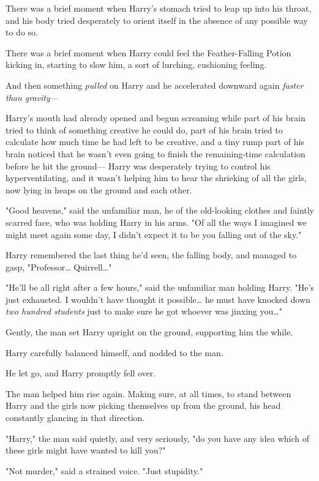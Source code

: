 There was a brief moment when Harry's stomach tried to leap up into his throat,
and his body tried desperately to orient itself in the absence of any possible
way to do so.

There was a brief moment when Harry could feel the Feather-Falling Potion
kicking in, starting to slow him, a sort of lurching, cushioning feeling.

And then something \emph{pulled} on Harry and he accelerated downward again
\emph{faster than gravity---}

Harry's mouth had already opened and begun screaming while part of his brain
tried to think of something creative he could do, part of his brain tried to
calculate how much time he had left to be creative, and a tiny rump part of his
brain noticed that he wasn't even going to finish the remaining-time
calculation before he hit the ground---
\later
Harry was desperately trying to control his hyperventilating, and it wasn't
helping him to hear the shrieking of all the girls, now lying in heaps on the
ground and each other.

"Good heavens," said the unfamiliar man, he of the old-looking clothes and
faintly scarred face, who was holding Harry in his arms. "Of all the ways I
imagined we might meet again some day, I didn't expect it to be you falling out
of the sky."

Harry remembered the last thing he'd seen, the falling body, and managed to
gasp, "Professor{\ldots} Quirrell{\ldots}"

"He'll be all right after a few hours," said the unfamiliar man holding Harry.
"He's just exhausted. I wouldn't have thought it possible{\ldots} he must have
knocked down \emph{two hundred students} just to make sure he got whoever was
jinxing you{\ldots}"

Gently, the man set Harry upright on the ground, supporting him the while.

Harry carefully balanced himself, and nodded to the man.

He let go, and Harry promptly fell over.

The man helped him rise again. Making sure, at all times, to stand between
Harry and the girls now picking themselves up from the ground, his head
constantly glancing in that direction.

"Harry," the man said quietly, and very seriously, "do you have any idea which
of these girls might have wanted to kill you?"

"Not murder," said a strained voice. "Just stupidity."

